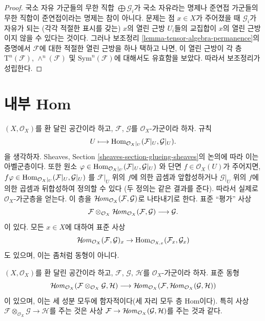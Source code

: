 \begin{proof}
국소 자유 가군들의 무한 직합 $\bigoplus \mathcal{G}_i$가 국소 자유라는
명제나 준연접 가군들의 무한 직합이 준연접이라는 명제는 참이 아니다.
문제는 점 $x \in X$가 주어졌을 때 $\mathcal{G}_i$가 자유가 되는
(각각 적절한 표시를 갖는) $x$의 열린 근방 $U_i$들의 교집합이
$x$의 열린 근방이지 않을 수 있다는 것이다. 그러나 보조정리
\ref{lemma-tensor-algebra-permanence}의 증명에서 $\mathcal{F}$에 대한
적절한 열린 근방을 하나 택하고 나면, 이 열린 근방이 각 층
$\text{T}^n(\mathcal{F})$, $\wedge^n(\mathcal{F})$ 및
$\text{Sym}^n(\mathcal{F})$에 대해서도 유효함을 보았다.
따라서 보조정리가 성립한다.
\end{proof}







\section{내부 Hom}
\label{section-internal-hom}

\noindent
$(X, \mathcal{O}_X)$를 환 달린 공간이라 하고,
$\mathcal{F}$, $\mathcal{G}$를 $\mathcal{O}_X$-가군이라 하자. 규칙
$$
U \longmapsto \mathop{\mathrm{Hom}}\nolimits_{\mathcal{O}_X|_U}(\mathcal{F}|_U, \mathcal{G}|_U).
$$
을 생각하자. Sheaves, Section \ref{sheaves-section-glueing-sheaves}의
논의에 따라 이는 아벨군층이다. 또한 원소
$\varphi \in \mathop{\mathrm{Hom}}\nolimits_{\mathcal{O}_X|_U}(\mathcal{F}|_U, \mathcal{G}|_U)$
와 단면 $f \in \mathcal{O}_X(U)$가 주어지면,
$f\varphi \in \mathop{\mathrm{Hom}}\nolimits_{\mathcal{O}_X|_U}(\mathcal{F}|_U, \mathcal{G}|_U)$
를 $\mathcal{F}|_U$ 위의 $f$에 의한 곱셈과 앞합성하거나
$\mathcal{G}|_U$ 위의 $f$에 의한 곱셈과 뒤합성하여 정의할 수 있다
(두 정의는 같은 결과를 준다). 따라서 실제로 $\mathcal{O}_X$-가군층을 얻는다.
이 층을 $\mathop{\mathcal{H}\!\mathit{om}}\nolimits_{\mathcal{O}_X}(\mathcal{F}, \mathcal{G})$로 나타내기로 한다.
표준 ``평가'' 사상
$$
\mathcal{F}
\otimes_{\mathcal{O}_X}
\mathop{\mathcal{H}\!\mathit{om}}\nolimits_{\mathcal{O}_X}(\mathcal{F}, \mathcal{G})
\longrightarrow
\mathcal{G}.
$$
이 있다. 모든 $x \in X$에 대하여 표준 사상
$$
\mathop{\mathcal{H}\!\mathit{om}}\nolimits_{\mathcal{O}_X}(\mathcal{F}, \mathcal{G})_x
\to
\mathop{\mathrm{Hom}}\nolimits_{\mathcal{O}_{X, x}}(\mathcal{F}_x, \mathcal{G}_x)
$$
도 있으며, 이는 좀처럼 동형이 아니다.

\begin{lemma}
\label{lemma-internal-hom}
$(X, \mathcal{O}_X)$를 환 달린 공간이라 하고,
$\mathcal{F}$, $\mathcal{G}$, $\mathcal{H}$를 $\mathcal{O}_X$-가군이라 하자.
표준 동형
$$
\mathop{\mathcal{H}\!\mathit{om}}\nolimits_{\mathcal{O}_X}
(\mathcal{F} \otimes_{\mathcal{O}_X} \mathcal{G}, \mathcal{H})
\longrightarrow
\mathop{\mathcal{H}\!\mathit{om}}\nolimits_{\mathcal{O}_X}
(\mathcal{F}, \mathop{\mathcal{H}\!\mathit{om}}\nolimits_{\mathcal{O}_X}(\mathcal{G}, \mathcal{H}))
$$
이 있으며, 이는 세 성분 모두에 함자적이다(세 자리 모두 층 Hom이다).
특히 사상 $\mathcal{F} \otimes_{\mathcal{O}_X} \mathcal{G} \to \mathcal{H}$를
주는 것은 사상
$\mathcal{F} \to \mathop{\mathcal{H}\!\mathit{om}}\nolimits_{\mathcal{O}_X}(\mathcal{G}, \mathcal{H})$를
주는 것과 같다.
\end{lemma}


